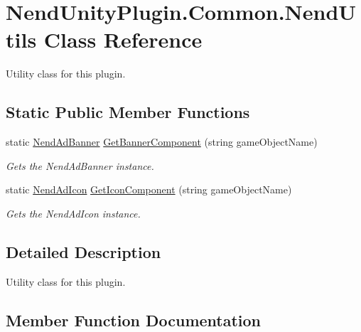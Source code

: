 \hypertarget{class_nend_unity_plugin_1_1_common_1_1_nend_utils}{}\section{Nend\+Unity\+Plugin.\+Common.\+Nend\+Utils Class Reference}
\label{class_nend_unity_plugin_1_1_common_1_1_nend_utils}


Utility class for this plugin.  


\subsection*{Static Public Member Functions}
\begin{DoxyCompactItemize}
\item 
static \hyperlink{class_nend_unity_plugin_1_1_a_d_1_1_nend_ad_banner}{Nend\+Ad\+Banner} \hyperlink{class_nend_unity_plugin_1_1_common_1_1_nend_utils_ab4681f35e034f663d07528cdffee9ded}{Get\+Banner\+Component} (string game\+Object\+Name)
\begin{DoxyCompactList}\small\item\em Gets the Nend\+Ad\+Banner instance. \end{DoxyCompactList}\item 
static \hyperlink{class_nend_unity_plugin_1_1_a_d_1_1_nend_ad_icon}{Nend\+Ad\+Icon} \hyperlink{class_nend_unity_plugin_1_1_common_1_1_nend_utils_a20b16bf1bc7d2e846197fb982960a013}{Get\+Icon\+Component} (string game\+Object\+Name)
\begin{DoxyCompactList}\small\item\em Gets the Nend\+Ad\+Icon instance. \end{DoxyCompactList}\end{DoxyCompactItemize}


\subsection{Detailed Description}
Utility class for this plugin. 



\subsection{Member Function Documentation}
\hypertarget{class_nend_unity_plugin_1_1_common_1_1_nend_utils_ab4681f35e034f663d07528cdffee9ded}{}
